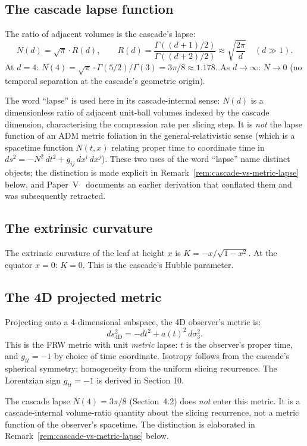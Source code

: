 \documentclass[12pt,a4paper]{article}
\begin{document}
\subsection{The cascade lapse function}

The ratio of adjacent volumes is the cascade's lapse:
\[
N(d) = \sqrt{\pi} \cdot R(d), \qquad R(d) = \frac{\Gamma((d + 1)/2)}{\Gamma((d + 2)/2)} \approx \sqrt{\frac{2\pi}{d}} \quad (d \gg 1).
\]
At $d = 4$: $N(4) = \sqrt{\pi} \cdot \Gamma(5/2)/\Gamma(3) = 3\pi/8 \approx 1.178$. As $d \to \infty$: $N \to 0$ (no temporal
separation at the cascade's geometric origin).

\noindent The word ``lapse'' is used here in its cascade-internal
sense: $N(d)$ is a dimensionless ratio of adjacent unit-ball volumes
indexed by the cascade dimension, characterising the compression rate
per slicing step. It is \emph{not} the lapse function of an ADM metric
foliation in the general-relativistic sense (which is a spacetime
function $N(t,x)$ relating proper time to coordinate time in
$ds^2 = -N^2\,dt^2 + g_{ij}\,dx^i\,dx^j$). These two uses of the word
``lapse'' name distinct objects; the distinction is made explicit in
Remark~\ref{rem:cascade-vs-metric-lapse} below, and
Paper~V~\cite{part5} documents an earlier derivation that conflated
them and was subsequently retracted.

\subsection{The extrinsic curvature}

The extrinsic curvature of the leaf at height $x$ is $K = -x/\sqrt{1 - x^2}$. At the equator $x = 0$:
$K = 0$. This is the cascade's Hubble parameter.

\subsection{The 4D projected metric}

Projecting onto a 4-dimensional subspace, the 4D observer's metric is:
\[
ds^2_{\text{4D}} = -dt^2 + a(t)^2\,d\sigma_3^2.
\]
This is the FRW metric with unit \emph{metric} lapse: $t$ is the
observer's proper time, and $g_{tt} = -1$ by choice of time coordinate.
Isotropy follows from the cascade's spherical symmetry; homogeneity
from the uniform slicing recurrence. The Lorentzian sign $g_{tt} = -1$
is derived in Section 10.

The cascade lapse $N(4) = 3\pi/8$ (Section~4.2) does \emph{not} enter
this metric. It is a cascade-internal volume-ratio quantity about the
slicing recurrence, not a metric function of the observer's spacetime.
The distinction is elaborated in Remark~\ref{rem:cascade-vs-metric-lapse}
below.
\end{document}
